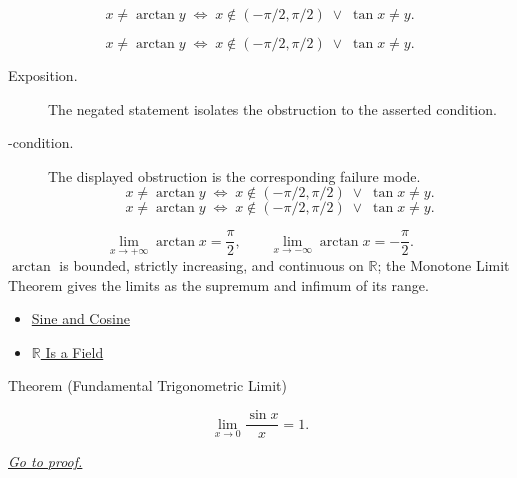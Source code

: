 \begin{remark*}
\[
  x\neq\arctan y
  \;\iff\;
  x\notin(-\pi/2,\pi/2) \;\vee\; \tan x \neq y.
\]
\end{remark*}

\begin{remark*}
\[
x\neq\arctan y
  \;\iff\;
  x\notin(-\pi/2,\pi/2) \;\vee\; \tan x \neq y.
\]
\end{remark*}

\begin{remark*}
\begin{description}
  \item[Exposition.]
  The negated statement isolates the obstruction to the asserted condition.

  \item[\neq-condition.]
  The displayed obstruction is the corresponding failure mode.
  \[
x\neq\arctan y
  \;\iff\;
  x\notin(-\pi/2,\pi/2) \;\vee\; \tan x \neq y.
  \]
  \[
x\neq\arctan y
  \;\iff\;
  x\notin(-\pi/2,\pi/2) \;\vee\; \tan x \neq y.
  \]
\end{description}
\end{remark*}



\begin{remark*}[Interpretation]
\[
  \lim_{x \to +\infty} \arctan x = \frac{\pi}{2},
  \qquad
  \lim_{x \to -\infty} \arctan x = -\frac{\pi}{2}.
\]
$\arctan$ is bounded, strictly increasing, and continuous on
$\mathbb{R}$; the Monotone Limit Theorem gives the limits as the
supremum and infimum of its range.
\end{remark*}

\begin{dependencies}
\begin{itemize}
  \item \hyperref[def:sine-cosine]{Sine and Cosine}
  \item \hyperref[thm:r-is-a-field]{$\mathbb{R}$ Is a Field}
\end{itemize}
\end{dependencies}


\begin{theorembox}{Theorem (Fundamental Trigonometric Limit)}
\begin{theorem}
\label{thm:fundamental-trig-limit}
\[
  \lim_{x \to 0} \frac{\sin x}{x} = 1.
\]

\smallskip\noindent


\hyperref[prf:fundamental-trig-limit]{\textit{Go to proof.}}
\end{theorem}
\end{theorembox}

